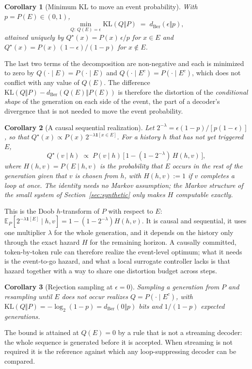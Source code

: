 \documentclass[11pt]{article}
\newcommand{\KL}{\mathrm{KL}}
\newcommand{\E}{\mathbb{E}}
\newtheorem{corollary}{Corollary}
\begin{document}
\begin{corollary}[Minimum KL to move an event probability]
\label{cor:min}
With $p=P(E)\in(0,1)$,
\[
  \min_{Q:\,Q(E)=\epsilon} \KL(Q\Vert P) \;=\; d_{\mathrm{Ber}}(\epsilon\Vert p),
\]
attained uniquely by $Q^\star(x)=P(x)\,\epsilon/p$ for $x\in E$ and $Q^\star(x)=P(x)\,(1-\epsilon)/(1-p)$ for $x\notin E$.
\end{corollary}
\noindent The last two terms of the decomposition are non-negative and each is minimized to zero by $Q(\cdot\mid E)=P(\cdot\mid E)$ and $Q(\cdot\mid E^c)=P(\cdot\mid E^c)$, which does not conflict with any value of $Q(E)$. The difference $\KL(Q\Vert P)-d_{\mathrm{Ber}}(Q(E)\Vert P(E))$ is therefore the distortion of the \emph{conditional shape} of the generation on each side of the event, the part of a decoder's divergence that is not needed to move the event probability.

\begin{corollary}[A causal sequential realization]
\label{cor:affine}
Let $2^{-\lambda}=\epsilon(1-p)/[p(1-\epsilon)]$, so that $Q^\star(x)\propto P(x)\,2^{-\lambda\mathbf{1}[x\in E]}$. For a history $h$ that has not yet triggered $E$,
\[ Q^\star(v\mid h)\;\propto\;P(v\mid h)\,\bigl[\,1-(1-2^{-\lambda})\,H(h,v)\,\bigr], \]
where $H(h,v)=P(E\mid h,v)$ is the probability that $E$ occurs in the rest of the generation given that $v$ is chosen from $h$, with $H(h,v){:=}1$ if $v$ completes a loop at once. The identity needs no Markov assumption; the Markov structure of the small system of Section~\ref{sec:synthetic} only makes $H$ computable exactly.
\end{corollary}
\noindent This is the Doob $h$-transform of $P$ with respect to $E$: $\E_P[2^{-\lambda\mathbf{1}[E]}\mid h,v]=1-(1-2^{-\lambda})H(h,v)$. It is causal and sequential, it uses one multiplier $\lambda$ for the whole generation, and it depends on the history only through the exact hazard $H$ for the remaining horizon. A causally committed, token-by-token rule can therefore realize the event-level optimum; what it needs is the event-to-go hazard, and what a local surrogate controller lacks is that hazard together with a way to share one distortion budget across steps.

\begin{corollary}[Rejection sampling at $\epsilon=0$]
\label{cor:reject}
Sampling a generation from $P$ and resampling until $E$ does not occur realizes $Q=P(\cdot\mid E^c)$, with $\KL(Q\Vert P)=-\log_2(1-p)=d_{\mathrm{Ber}}(0\Vert p)$ bits and $1/(1-p)$ expected generations.
\end{corollary}
\noindent The bound is attained at $Q(E)=0$ by a rule that is not a streaming decoder: the whole sequence is generated before it is accepted. When streaming is not required it is the reference against which any loop-suppressing decoder can be compared.
\end{document}
